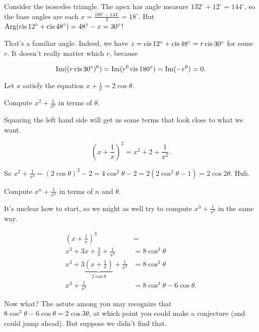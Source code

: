 \documentclass[../key.tex]{subfiles}
\begin{document}
Consider the isosceles triangle. The apex has angle measure $132^\circ + 12^\circ = 144^\circ$, so the base angles are each $x=\frac{180^\circ - 144^\circ}{2} = 18^\circ$. But $\operatorname{Arg} (\operatorname{cis} 12^\circ + \operatorname{cis} 48^\circ) = 48^\circ - x = 30^\circ$!

That's a familiar angle. Indeed, we have $z=\operatorname{cis} 12^\circ + \operatorname{cis} 48^\circ=r\operatorname{cis} 30^\circ$ for some $r$. It doesn't really matter which $r$, because

$$\operatorname{Im} ((r\operatorname{cis} 30^\circ)^6) = \operatorname{Im} (r^6 \operatorname{cis} 180^\circ) = \operatorname{Im}(-r^6) = 0.$$

\begin{outer_problem}
\item Let $x$ satisfy the equation $x+\frac{1}{x}=2\cos\theta$.
\end{outer_problem}

\begin{inner_problem}[start=1]
\item Compute $x^2+\frac{1}{x^2}$ in terms of $\theta$.
\end{inner_problem}

Squaring the left hand side will get us some terms that look close to what we want.

$$\left(x + \frac{1}{x}\right)^2 = x^2 + 2 + \frac{1}{x^2}.$$

So $x^2 + \frac{1}{x^2} = (2\cos\theta)^2 - 2 = 4\cos^2\theta - 2 = 2 (2\cos^2\theta - 1) = 2\cos 2\theta$. Huh.

\begin{inner_problem}
\item Compute $x^n+\frac{1}{x^n}$ in terms of $n$ and $\theta$.
\end{inner_problem}

It's unclear how to start, so we might as well try to compute $x^3 + \frac{1}{x^3}$ in the same way.

\begin{align*}
    \left(x + \frac{1}{x}\right)^3 &= \\
    x^3 + 3x + \frac{3}{x} + \frac{1}{x^3} &= 8\cos^3\theta \\
    x^3 + 3\underbrace{\left(x + \frac{1}{x}\right)}_{2\cos \theta} + \frac{1}{x^3} &= 8\cos^3\theta \\
    x^3 + \frac{1}{x^3} &= 8\cos^3\theta - 6\cos\theta.
\end{align*}

Now what? The astute among you may recognize that $8\cos^3\theta - 6\cos\theta = 2\cos 3\theta$, at which point you could make a conjecture (and could jump ahead). But suppose we didn't find that.
\end{document}
